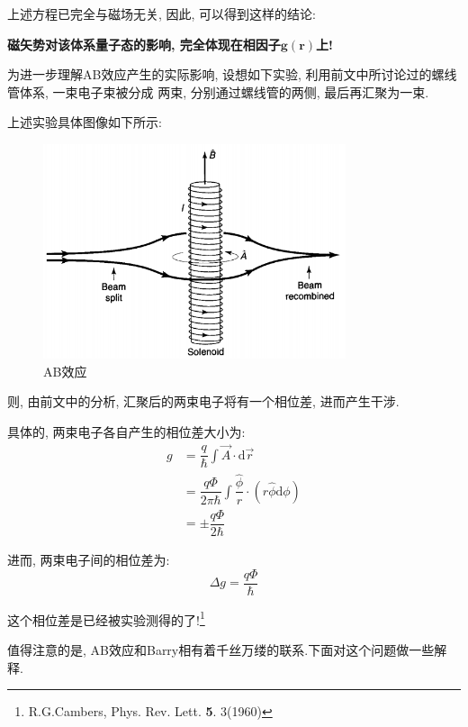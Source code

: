 \documentclass[a4paper, 11pt]{article}
\begin{document}
\begin{spacing}{1.2}
        上述方程已完全与磁场无关, 因此, 可以得到这样的结论:

        \textbf{磁矢势对该体系量子态的影响, 完全体现在相因子$\mathbf{g(r)}$上!}

        为进一步理解AB效应产生的实际影响, 设想如下实验, 利用前文中所讨论过的螺线管体系, 一束电子束被分成
        两束, 分别通过螺线管的两侧, 最后再汇聚为一束. 

        上述实验具体图像如下所示:

        \begin{figure}[H]
          \centering\includegraphics[width=3.5in]{image/ABeffect_2}
          \caption{AB效应}\label{AB_effect_2} 
        \end{figure}

        则, 由前文中的分析, 汇聚后的两束电子将有一个相位差, 进而产生干涉.

        具体的, 两束电子各自产生的相位差大小为:
        \begin{equation}
          \begin{aligned}
            g &= \dfrac{q}{\hbar}\int\vec{A}\cdot\mathrm{d}\vec{r} \\
              &= \dfrac{q\Phi}{2\pi\hbar}\int\dfrac{\hat{\phi}}{r}\cdot(r\hat{\phi}\mathrm{d}\phi)\\
              &= \pm\dfrac{q\Phi}{2\hbar}
          \end{aligned}
        \end{equation}
            
        进而, 两束电子间的相位差为:
        \begin{equation}
          \Delta{}g = \dfrac{q\Phi}{\hbar}
        \end{equation}

        这个相位差是已经被实验测得的了!\footnote{R.G.Cambers, Phys. Rev. Lett. \textbf{5}. 3(1960)}

        值得注意的是, AB效应和Barry相有着千丝万缕的联系.下面对这个问题做一些解释. 


\end{spacing}
\end{document}
